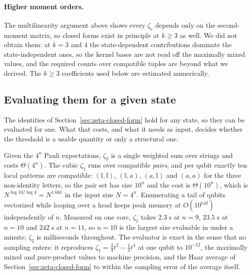 \documentclass[a4paper,superscriptaddress,nofootinbib,onecolumn,nopdfoutputerror]{quantumarticle}
\begin{document}
\paragraph{Higher moment orders.}
The multilinearity argument above shows every \(\zeta_c\) depends only on
the second-moment matrix, so closed forms exist in principle at \(k \ge 3\)
as well. We did not obtain them: at \(k = 3\) and \(4\) the
state-dependent contributions dominate the state-independent ones, so the
kernel bases are not read off the maximally mixed values, and the
required counts over compatible tuples are beyond what we derived. The
\(k \ge 3\) coefficients used below are estimated numerically.

\hypertarget{evaluating-them-for-a-given-state}{%
\subsection{Evaluating them for a given state}\label{sec:evaluation-cost}}

The identities of Section~\ref{sec:zeta-closed-form} hold for any state, so they can be
evaluated for one. What that costs, and what it needs as input, decides whether the threshold is
a usable quantity or only a structural one.

Given the \(4^n\) Pauli expectations, \(\zeta_2\) is a single weighted sum over strings and costs
\(\Theta(4^n)\). The cubic \(\zeta_1\) runs over compatible \emph{pairs}, and per qubit exactly
ten local patterns are compatible: \((\mathbb{I},\mathbb{I})\), \((\mathbb{I},a)\),
\((a,\mathbb{I})\) and \((a,a)\) for the three non-identity letters, so the pair set has size
\(10^n\) and the cost is \(\Theta(10^n)\), which is \(N^{\log 10/\log 4} = N^{1.661}\) in the
input size \(N = 4^n\). Enumerating a tail of qubits vectorized while looping over a head keeps
peak memory at \(O(10^{\text{tail}})\) independently of \(n\). Measured on one core, \(\zeta_1\)
takes \(2.3\;\mathrm{s}\) at \(n = 9\), \(23.5\;\mathrm{s}\) at \(n = 10\) and
\(242\;\mathrm{s}\) at \(n = 11\), so \(n = 10\) is the largest size evaluable in under a minute;
\(\zeta_2\) is milliseconds throughout. The evaluator is exact in the sense that no sampling
enters: it reproduces \(\zeta_1 = \tfrac34 t^2 - \tfrac14 t^4\) at one qubit to \(10^{-12}\), the
maximally mixed and pure-product values to machine precision, and the Haar average of
Section~\ref{sec:zeta-closed-form} to within the sampling error of the average itself.
\end{document}
